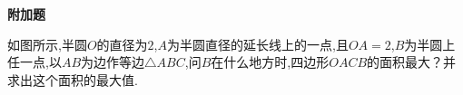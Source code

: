 \begin{questions}
	\begin{center}
		\textbf{附加题}
	\end{center}

	\question
	如图所示,半圆$O$的直径为$2$,$A$为半圆直径的延长线上的一点,且$OA=2$,$B$为半圆上任一点,以$AB$为边作等边$\triangle{ABC}$,问$B$在什么地方时,四边形$OACB$的面积最大？并求出这个面积的最大值.
	\begin{center}
	\end{center}


\end{questions}
